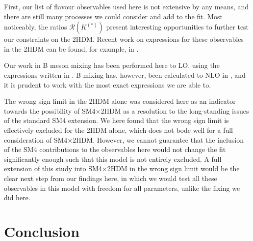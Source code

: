\documentclass[a4paper,12pt]{article}
\begin{document}
First, our list of flavour observables used here is not extensive by any means, and there are still many processes we could consider and add to the fit. 
Most noticeably, the ratios $\mathcal{R}(K^{(*)})$ present interesting opportunities to further test our constraints on the 2HDM. 
Recent work on expressions for these observables in the 2HDM can be found, for example, in \cite{criv}. 

Our work in B meson mixing has been performed here to LO, using the expressions written in \cite{desc}. 
B mixing has, however, been calculated to NLO in \cite{frank}, and it is prudent to work with the most exact expressions we are able to. 

The wrong sign limit in the 2HDM alone was considered here as an indicator towards the possibility of SM4$\times$2HDM as a resolution to the long-standing issues of the standard SM4 extension. 
We here found that the wrong sign limit is effectively excluded for the 2HDM alone, which does not bode well for a full consideration of SM4$\times$2HDM. 
However, we cannot guarantee that the inclusion of the SM4 contributions to the observables here would not change the fit significantly enough such that this model is not entirely excluded. 
A full extension of this study into SM4$\times$2HDM in the wrong sign limit would be the clear next step from our findings here, in which we would test all these observables in this model with freedom for all parameters, unlike the fixing we did here. 

\section{Conclusion}

%
%
\end{document}
